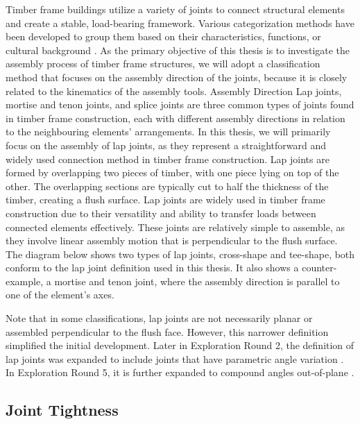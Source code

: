 Timber frame buildings utilize a variety of joints to connect structural elements and create a stable, load-bearing framework. Various categorization methods have been developed to group them based on their characteristics, functions, or cultural background . As the primary objective of this thesis is to investigate the assembly process of timber frame structures, we will adopt a classification method that focuses on the assembly direction of the joints, because it is closely related to the kinematics of the assembly tools.
Assembly Direction
Lap joints, mortise and tenon joints, and splice joints are three common types of joints found in timber frame construction, each with different assembly directions in relation to the neighbouring elements' arrangements. In this thesis, we will primarily focus on the assembly of lap joints, as they represent a straightforward and widely used connection method in timber frame construction. 
Lap joints are formed by overlapping two pieces of timber, with one piece lying on top of the other. The overlapping sections are typically cut to half the thickness of the timber, creating a flush surface. Lap joints are widely used in timber frame construction due to their versatility and ability to transfer loads between connected elements effectively. These joints are relatively simple to assemble, as they involve linear assembly motion that is perpendicular to the flush surface. 
The diagram below shows two types of lap joints, cross-shape and tee-shape, both conform to the lap joint definition used in this thesis. It also shows a counter-example, a mortise and tenon joint, where the assembly direction is parallel to one of the element’s axes. 


Note that in some classifications, lap joints are not necessarily planar or assembled perpendicular to the flush face. However, this narrower definition simplified the initial development. Later in Exploration Round 2, the definition of lap joints was expanded to include joints that have parametric angle variation . In Exploration Round 5, it is further expanded to compound angles out-of-plane . 
\subsection{Joint Tightness}
\label{subsection:exploration_1_joint_tightness}

